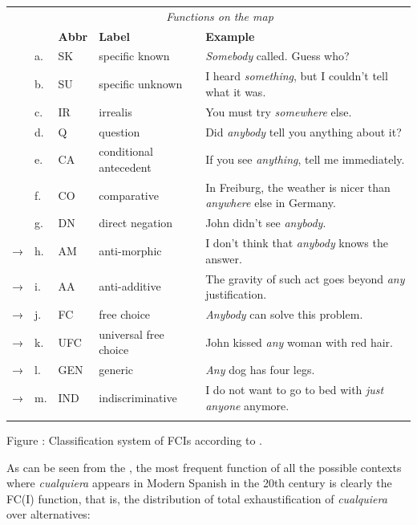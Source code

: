 \documentclass[output=paper]{langscibook}
\begin{document}
\begin{tabularx}{\textwidth}{XXXXX}
 & \multicolumn{4}{c}{\textit{Functions on the map}}\\
\lsptoprule
&  & \textbf{Abbr} & \textbf{Label} & \textbf{Example}\\
& a. & SK & specific known & \textit{Somebody} called. Guess who?\\
& b. & SU & specific unknown & I heard \textit{something}, but I couldn’t tell what it was.\\
& c. & IR & irrealis & You must try \textit{somewhere} else.\\
& d. & Q & question & Did \textit{anybody} tell you anything about it?\\
& e. & CA & conditional antecedent & If you see \textit{anything}, tell me immediately.\\
& f. & CO & comparative & In Freiburg, the weather is nicer than \textit{anywhere} else in Germany.\\
& g. & DN & direct negation & John didn’t see \textit{anybody}.\\
→ & h. & AM & anti-morphic & I don’t think that \textit{anybody} knows the answer.\\
→ & i. & AA & anti-additive & The gravity of such act goes beyond \textit{any} justification.\\
→ & j. & FC & free choice & \textit{Anybody} can solve this problem.\\
→ & k. & UFC & universal free choice & John kissed \textit{any} woman with red hair.\\
→ & l. & GEN & generic & \textit{Any} dog has four legs.\\
→ & m. & IND & indiscriminative & I do not want to go to bed with \textit{just anyone} anymore.\\
\lspbottomrule
\end{tabularx}
\begin{styletablecaption}
Figure : Classification system of FCIs according to \citet{AloniEtAl2010}.
\end{styletablecaption}

As can be seen from the , the most frequent function of all the possible contexts where \textit{cualquiera} appears in Modern Spanish in the 20th century is clearly the FC(I) function, that is, the distribution of total exhaustification of \textit{cualquiera} over alternatives:

  
 
\end{document}
